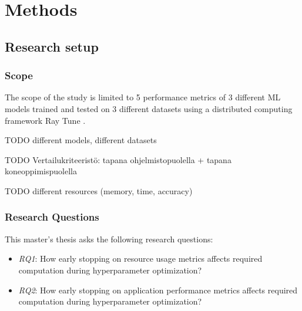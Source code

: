 \chapter{Methods}
\label{chap:methods}

\section{Research setup}
\subsection{Scope}
The scope of the study is limited to 5 performance metrics of 3 different ML models trained and tested on 3 different datasets using a distributed computing framework Ray Tune \parencite{liawTuneResearchPlatform2018}.

TODO different models, different datasets

TODO Vertailukriteeristö: tapana ohjelmistopuolella + tapana koneoppimispuolella

TODO different resources (memory, time, accuracy)



\subsection{Research Questions}
This master's thesis asks the following research questions:
\begin{itemize}
    \item \emph{RQ1}: How early stopping on resource usage metrics affects required computation during hyperparameter optimization?
    \item \emph{RQ2}: How early stopping on application performance metrics affects required computation during hyperparameter optimization?

\end{itemize}


